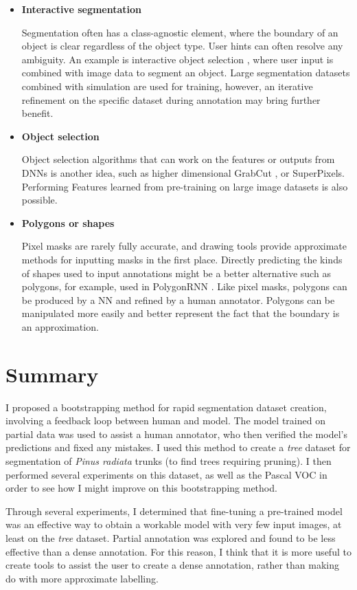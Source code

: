 \begin{itemize}
    
\item  {\bf Interactive segmentation} \par
Segmentation often has a class-agnostic element, where the boundary of an object is clear regardless of the object type. User hints can often resolve any ambiguity. An example is interactive object selection \cite{Xu2016, Xu2017}, where user input is combined with image data to segment an object. Large segmentation datasets combined with simulation are used for training, however, an iterative refinement on the specific dataset during annotation may bring further benefit.

\item  {\bf Object selection} \par
Object selection algorithms that can work on the features or outputs from \gls{DNN}s is another idea, such as higher dimensional GrabCut \cite{Xu2016a}, or SuperPixels. Performing Features learned from pre-training on large image datasets is also possible.

\item  {\bf Polygons or shapes} \par
Pixel masks are rarely fully accurate, and drawing tools provide approximate methods for inputting masks in the first place. Directly predicting the kinds of shapes used to input annotations might be a better alternative such as polygons, for example, used in PolygonRNN \cite{Castrejon2017}. Like pixel masks, polygons can be produced by a \gls{NN} and refined by a human annotator. Polygons can be manipulated more easily and better represent the fact that the boundary is an approximation.
\end{itemize}

\section {Summary}

I proposed a bootstrapping method for rapid segmentation dataset creation, involving a feedback loop between human and model. The model trained on partial data was used to assist a human annotator, who then verified the model's predictions and fixed any mistakes. I used this method to create a \emph{tree} dataset for segmentation of \emph{Pinus radiata} trunks (to find trees requiring pruning). I then performed several experiments on this dataset, as well as the Pascal VOC in order to see how I might improve on this bootstrapping method. 

Through several experiments, I determined that fine-tuning a pre-trained model was an effective way to obtain a workable model with very few input images, at least on the \emph{tree} dataset. Partial annotation was explored and found to be less effective than a dense annotation. For this reason, I think that it is more useful to create tools to assist the user to create a dense annotation, rather than making do with more approximate labelling. 